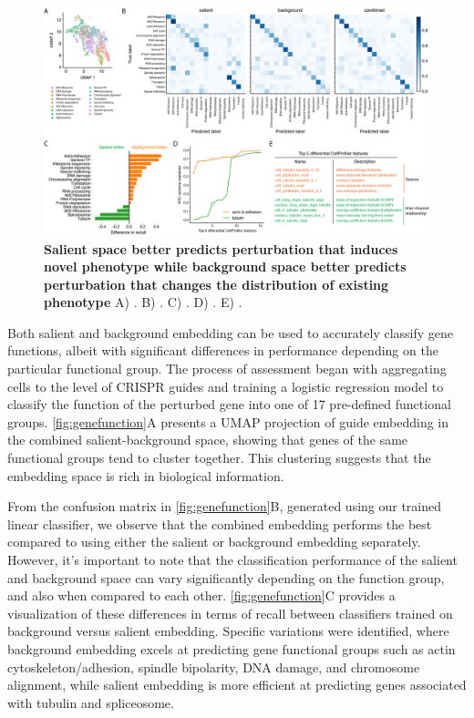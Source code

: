 \documentclass{article}
\begin{document}
\begin{figure}[h!]
    \centering
    \includegraphics[width=\textwidth]{figure/figure_3.png}
    \caption{\textbf{Salient space better predicts perturbation that induces novel phenotype while background space better predicts perturbation that changes the distribution of existing phenotype}
    A) .
    B) .
    C) .
    D) .
    E) .}
    \label{fig:genefunction}
\end{figure}


Both salient and background embedding can be used to accurately classify gene functions, albeit with significant differences in performance depending on the particular functional group. The process of assessment began with aggregating cells to the level of CRISPR guides and training a logistic regression model to classify the function of the perturbed gene into one of 17 pre-defined functional groups. \autoref{fig:genefunction}A presents a UMAP projection of guide embedding in the combined salient-background space, showing that genes of the same functional groups tend to cluster together. This clustering suggests that the embedding space is rich in biological information.

From the confusion matrix in \autoref{fig:genefunction}B, generated using our trained linear classifier, we observe that the combined embedding performs the best compared to using either the salient or background embedding separately. However, it's important to note that the classification performance of the salient and background space can vary significantly depending on the function group, and also when compared to each other. \autoref{fig:genefunction}C provides a visualization of these differences in terms of recall between classifiers trained on background versus salient embedding. Specific variations were identified, where background embedding excels at predicting gene functional groups such as actin cytoskeleton/adhesion, spindle bipolarity, DNA damage, and chromosome alignment, while salient embedding is more efficient at predicting genes associated with tubulin and spliceosome.
\end{document}
